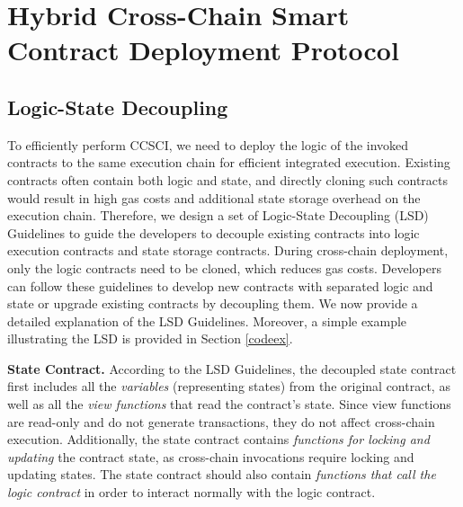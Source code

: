 
\section{Hybrid Cross-Chain Smart Contract Deployment Protocol}


\subsection{Logic-State Decoupling}
\label{subsec:LSD}

To efficiently perform CCSCI, we need to deploy the logic of the invoked contracts to the same execution chain for efficient integrated execution. 
Existing contracts often contain both logic and state, and directly cloning such contracts would result in high gas costs and additional state storage overhead on the execution chain. 
Therefore, we design a set of Logic-State Decoupling (LSD) Guidelines to guide the developers to decouple existing contracts into logic execution contracts and state storage contracts. 
During cross-chain deployment, only the logic contracts need to be cloned, which reduces gas costs. 
Developers can follow these guidelines to develop new contracts with separated logic and state or upgrade existing contracts by decoupling them. 
We now provide a detailed explanation of the LSD Guidelines.
Moreover, a simple example illustrating the LSD is provided in Section \ref{codeex}.

\vspace{3pt}
\noindent
\textbf{State Contract.}
According to the LSD Guidelines, the decoupled state contract first includes all the \emph{variables} (representing states) from the original contract, as well as all the \emph{view functions} that read the contract's state. 
Since view functions are read-only and do not generate transactions, they do not affect cross-chain execution. 
Additionally, the state contract contains \emph{functions for locking and updating} the contract state, as cross-chain invocations require locking and updating states. 
The state contract should also contain \emph{functions that call the logic contract} in order to interact normally with the logic contract.

